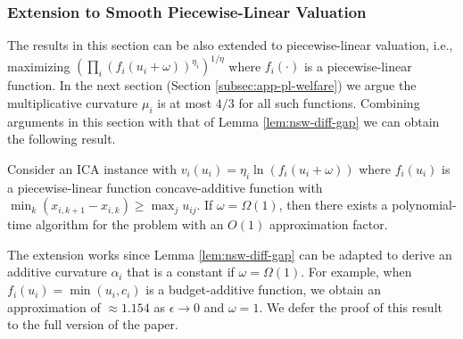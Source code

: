 \subsubsection{Extension to Smooth Piecewise-Linear Valuation}
\label{subsub:anw-pl}
The results in this section can be also extended to  piecewise-linear valuation, i.e., maximizing $\left(\prod_i (f_i(u_i + \omega))^{\eta_i}\right)^{1/\eta}$ where $f_i(\cdot)$ is a piecewise-linear function.  In the next section (Section \ref{subsec:app-pl-welfare}) we argue the multiplicative curvature $\mu_i$ is at most $4/3$ for all such functions. Combining arguments in this section  with that of Lemma \ref{lem:nsw-diff-gap} we can obtain the following result.

\begin{theorem} 
\label{thm:anw-pl}
Consider an ICA instance with $v_i(u_i) = \eta_i \ln(f_i(u_i + \omega))$ where $f_i(u_i)$ is a piecewise-linear function concave-additive function with $\min_{k}\left(x_{i,k+1} - x_{i,k}\right) \geq \max_{j} u_{ij}$.
If $\omega = \Omega(1)$, then there exists a polynomial-time algorithm for the problem with an $O(1)$ approximation factor.
\end{theorem}

The extension works since Lemma \ref{lem:nsw-diff-gap} can be adapted to derive an additive curvature $\alpha_i$ that is a constant if $\omega = \Omega(1)$.
For example, when $f_i(u_i) = \min(u_i, c_i)$ is a budget-additive function, we obtain an approximation of $\approx  1.154$ as $\epsilon \rightarrow 0$ and $\omega = 1$.
We defer the proof of this result to the full version of the paper.





